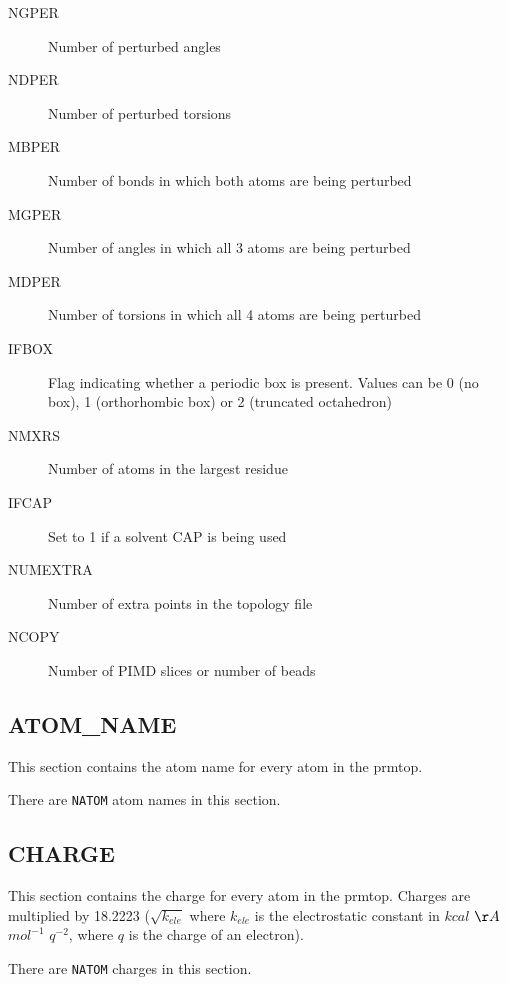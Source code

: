 \begin{description}
   \item[NGPER] Number of perturbed angles \footnotemark
      \addtocounter{footnote}{-1} \addtocounter{Hfootnote}{-1}
   \item[NDPER] Number of perturbed torsions \footnotemark
      \addtocounter{footnote}{-1} \addtocounter{Hfootnote}{-1}
   \item[MBPER] Number of bonds in which both atoms are being perturbed
      \footmarknote \addtocounter{footnote}{-1} \addtocounter{Hfootnote}{-1}
   \item[MGPER] Number of angles in which all 3 atoms are being perturbed
      \footmarknote \addtocounter{footnote}{-1} \addtocounter{Hfootnote}{-1}
   \item[MDPER] Number of torsions in which all 4 atoms are being perturbed
      \footnotemark
   \item[IFBOX] Flag indicating whether a periodic box is present. Values can be
      0 (no box), 1 (orthorhombic box) or 2 (truncated octahedron)
   \item[NMXRS] Number of atoms in the largest residue
   \item[IFCAP] Set to 1 if a solvent CAP is being used
   \item[NUMEXTRA] Number of extra points in the topology file
   \item[NCOPY] Number of PIMD slices or number of beads
\end{description}

\subsection*{ATOM\_NAME}

This section contains the atom name for every atom in the prmtop.

\noindent There are {\tt NATOM} atom names in this section.

\subsection*{CHARGE}

This section contains the charge for every atom in the prmtop. Charges are
multiplied by 18.2223 ($\sqrt{k_{ele}}$ where $k_{ele}$ is the electrostatic
constant in $kcal$ $\AA$ $mol^{-1}$ $q^{-2}$, where $q$ is the charge of an
electron).


\noindent There are {\tt NATOM} charges in this section.

